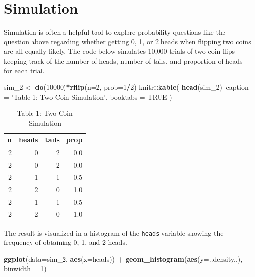 \documentclass[]{book}
\newenvironment{Shaded}{\begin{snugshade}}{\end{snugshade}}
\newcommand{\KeywordTok}[1]{\textcolor[rgb]{0.13,0.29,0.53}{\textbf{#1}}}
\newcommand{\DataTypeTok}[1]{\textcolor[rgb]{0.13,0.29,0.53}{#1}}
\newcommand{\DecValTok}[1]{\textcolor[rgb]{0.00,0.00,0.81}{#1}}
\newcommand{\StringTok}[1]{\textcolor[rgb]{0.31,0.60,0.02}{#1}}
\newcommand{\OtherTok}[1]{\textcolor[rgb]{0.56,0.35,0.01}{#1}}
\newcommand{\OperatorTok}[1]{\textcolor[rgb]{0.81,0.36,0.00}{\textbf{#1}}}
\newcommand{\NormalTok}[1]{#1}
\theoremstyle{definition}
\theoremstyle{definition}
\theoremstyle{definition}
\theoremstyle{remark}
\begin{document}
\section{Simulation}\label{simulation}

Simulation is often a helpful tool to explore probability questions like
the question above regarding whether getting 0, 1, or 2 heads when
flipping two coins are all equally likely. The code below simulates
10,000 trials of two coin flips keeping track of the number of heads,
number of tails, and proportion of heads for each trial.

\begin{Shaded}
\begin{Highlighting}[]
\NormalTok{sim_}\DecValTok{2}\NormalTok{ <-}\StringTok{ }\KeywordTok{do}\NormalTok{(}\DecValTok{10000}\NormalTok{)}\OperatorTok{*}\KeywordTok{rflip}\NormalTok{(}\DataTypeTok{n=}\DecValTok{2}\NormalTok{, }\DataTypeTok{prob=}\DecValTok{1}\OperatorTok{/}\DecValTok{2}\NormalTok{)}
\NormalTok{knitr}\OperatorTok{::}\KeywordTok{kable}\NormalTok{(}
  \KeywordTok{head}\NormalTok{(sim_}\DecValTok{2}\NormalTok{), }\DataTypeTok{caption =} \StringTok{'Table 1: Two Coin Simulation'}\NormalTok{,}
  \DataTypeTok{booktabs =} \OtherTok{TRUE}
\NormalTok{)}
\end{Highlighting}
\end{Shaded}

\begin{table}

\caption{\label{tab:nice-tab}Table 1: Two Coin Simulation}
\centering
\begin{tabular}[t]{rrrr}
\toprule
n & heads & tails & prop\\
\midrule
2 & 0 & 2 & 0.0\\
2 & 0 & 2 & 0.0\\
2 & 1 & 1 & 0.5\\
2 & 2 & 0 & 1.0\\
2 & 1 & 1 & 0.5\\
2 & 2 & 0 & 1.0\\
\bottomrule
\end{tabular}
\end{table}

The result is visualized in a histogram of the \texttt{heads} variable
showing the frequency of obtaining 0, 1, and 2 heads.

\begin{Shaded}
\begin{Highlighting}[]
\KeywordTok{ggplot}\NormalTok{(}\DataTypeTok{data=}\NormalTok{sim_}\DecValTok{2}\NormalTok{, }\KeywordTok{aes}\NormalTok{(}\DataTypeTok{x=}\NormalTok{heads)) }\OperatorTok{+}\StringTok{ }\KeywordTok{geom_histogram}\NormalTok{(}\KeywordTok{aes}\NormalTok{(}\DataTypeTok{y=}\NormalTok{..density..), }\DataTypeTok{binwidth =} \DecValTok{1}\NormalTok{)}
\end{Highlighting}
\end{Shaded}
\end{document}
